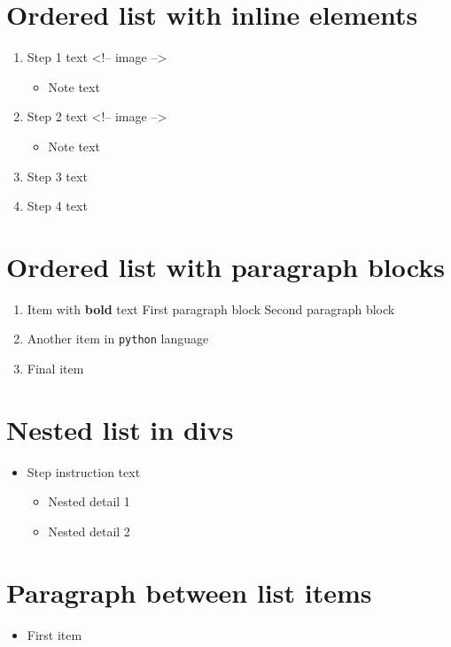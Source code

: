 \documentclass[11pt,a4paper]{article}
\begin{document}
\section{Ordered list with inline elements}

\begin{enumerate}
\item Step 1 text
<!-- image -->
  \begin{itemize}
\item Note text
  \end{itemize}
\item Step 2 text
<!-- image -->
  \begin{itemize}
\item Note text
  \end{itemize}
\item Step 3 text
\item Step 4 text
\end{enumerate}

\section{Ordered list with paragraph blocks}

\begin{enumerate}
\item Item with \textbf{bold} text First paragraph block Second paragraph block
\item Another item in \texttt{python} language
\item Final item
\end{enumerate}

\section{Nested list in divs}

\begin{itemize}
\item Step instruction text
  \begin{itemize}
\item Nested detail 1
\item Nested detail 2
  \end{itemize}
\end{itemize}

\section{Paragraph between list items}

\begin{itemize}
\item First item
\end{itemize}
\end{document}
